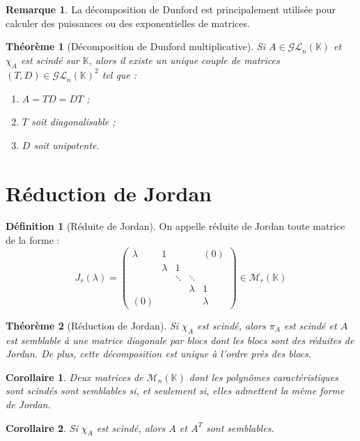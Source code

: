 \documentclass[french]{article}
\newcommand{\K}{\mathbb{K}}
\theoremstyle{plain}
\newtheorem{thm}{Théorème}
\newtheorem{cor}{Corollaire}
\theoremstyle{definition}
\newtheorem{dfn}{Définition}
\newtheorem{rmq}{Remarque}
\begin{document}
\begin{rmq}
	La décomposition de Dunford est principalement utilisée pour calculer des puissances ou des exponentielles de matrices.
\end{rmq}

\begin{thm}[Décomposition de Dunford multiplicative]
	Si $A\in\mathcal{GL}_n(\K)$ et $\chi_A$ est scindé sur $\K$, alors il existe un unique couple de matrices $(T,D)\in\mathcal{GL}_n(\K)^2$ tel que :
	\begin{enumerate}
		\item $A=TD=DT$ ;
		\item $T$ soit diagonalisable ;
		\item $D$ soit unipotente.
	\end{enumerate}
\end{thm}

\section{Réduction de Jordan}

\begin{dfn}[Réduite de Jordan]
	On appelle réduite de Jordan toute matrice de la forme : $$J_r(\lambda)=\begin{pmatrix}
		\lambda&1&&&(0)\\
		&\lambda&1&& \\
		&&\ddots&\ddots& \\
		&&&\lambda&1 \\
		(0)&&&&\lambda
	\end{pmatrix}\in\mathcal{M}_r(\K)$$
\end{dfn}

\begin{thm}[Réduction de Jordan]
	Si $\chi_A$ est scindé, alors $\pi_A$ est scindé et $A$ est semblable à une matrice diagonale par blocs dont les blocs sont des réduites de Jordan. De plus, cette décomposition est unique à l'ordre près des blocs.
\end{thm}

\begin{cor}
	Deux matrices de $\mathcal{M}_n(\K)$ dont les polynômes caractéristiques sont scindés sont semblables si, et seulement si, elles admettent la même forme de Jordan.
\end{cor}

\begin{cor}
	Si $\chi_A$ est scindé, alors $A$ et $A^T$ sont semblables.
\end{cor}
\end{document}
